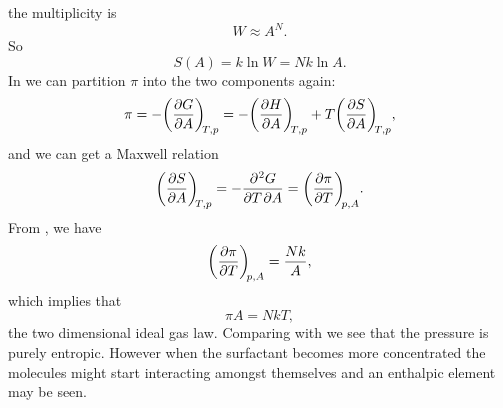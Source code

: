 the multiplicity is 
\begin{equation}
W\approx A^N.
\end{equation}
So
\begin{equation}
\label{s_langmuir}
S(A)=k\ln W=Nk\ln A.
\end{equation}
In  we can partition $\pi$ into the two components again:
\begin{equation}
\label{pi_langmuir}
\pi=-\diffp GA[T,p]=-\diffp HA[T,p]+T\diffp SA[T,p], 
\end{equation}
and we can get a Maxwell relation 
\begin{equation}
\diffp SA[T,p]=-\diffp {G}{T,A}=\diffp{\pi}{T}[p,A].
\end{equation}
From , we have
\begin{equation}
\diffp{\pi}{T}[p,A]=\frac{Nk}{A}, 
\end{equation}
which implies that
\begin{equation}
\pi A=NkT, 
\end{equation}
the two dimensional ideal gas law. 
Comparing with  we see that the pressure is purely entropic. 
However when the surfactant becomes more concentrated 
the molecules might start interacting amongst themselves and an enthalpic element may be seen. 
